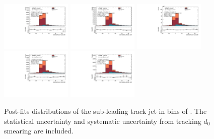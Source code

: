 \begin{figure}[htbp]
  \centering
 \includegraphics[width=0.3\textwidth]{figures/gbb/Sub_Sd0_Fits/Canv_Fit_-3-logM_bb_over_p_TG--22_coarse_y.pdf}
 \includegraphics[width=0.3\textwidth]{figures/gbb/Sub_Sd0_Fits/Canv_Fit_-22-logM_bb_over_p_TG--19_coarse_y.pdf}
 \includegraphics[width=0.3\textwidth]{figures/gbb/Sub_Sd0_Fits/Canv_Fit_-19-logM_bb_over_p_TG--15_coarse_y.pdf}\\
 \includegraphics[width=0.3\textwidth]{figures/gbb/Sub_Sd0_Fits/Canv_Fit_-15-logM_bb_over_p_TG--11_coarse_y.pdf}
 \includegraphics[width=0.3\textwidth]{figures/gbb/Sub_Sd0_Fits/Canv_Fit_-11-logM_bb_over_p_TG-0_coarse_y.pdf}

\caption{Post-fits \subsdzero distributions of the sub-leading track jet in bins of \mpt. The statistical uncertainty and systematic uncertainty from tracking $d_0$ smearing are included.}
  \label{fig:fracmasspt-postfits-subleading-sub}
\end{figure}



